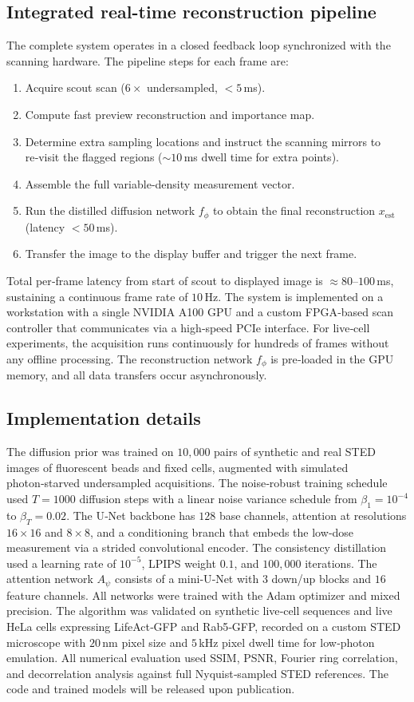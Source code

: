 \documentclass{article}
\begin{document}
\subsection{Integrated real-time reconstruction pipeline}
The complete system operates in a closed feedback loop synchronized with the scanning hardware. The pipeline steps for each frame are:
\begin{enumerate}
    \item Acquire scout scan ($6\times$ undersampled, $<5$\,ms).
    \item Compute fast preview reconstruction and importance map.
    \item Determine extra sampling locations and instruct the scanning mirrors to re‑visit the flagged regions ($\sim\!10$\,ms dwell time for extra points).
    \item Assemble the full variable‑density measurement vector.
    \item Run the distilled diffusion network $f_\phi$ to obtain the final reconstruction $x_{\mathrm{est}}$ (latency $< 50$\,ms).
    \item Transfer the image to the display buffer and trigger the next frame.
\end{enumerate}
Total per‑frame latency from start of scout to displayed image is $\approx 80$–$100$\,ms, sustaining a continuous frame rate of $10$\,Hz. The system is implemented on a workstation with a single NVIDIA A100 GPU and a custom FPGA‑based scan controller that communicates via a high‑speed PCIe interface. For live‑cell experiments, the acquisition runs continuously for hundreds of frames without any offline processing. The reconstruction network $f_\phi$ is pre‑loaded in the GPU memory, and all data transfers occur asynchronously.

\subsection{Implementation details}
The diffusion prior was trained on $10,000$ pairs of synthetic and real STED images of fluorescent beads and fixed cells, augmented with simulated photon‑starved undersampled acquisitions. The noise‑robust training schedule used $T = 1000$ diffusion steps with a linear noise variance schedule from $\beta_1 = 10^{-4}$ to $\beta_T = 0.02$. The U‑Net backbone has $128$ base channels, attention at resolutions $16\times 16$ and $8\times 8$, and a conditioning branch that embeds the low‑dose measurement via a strided convolutional encoder. The consistency distillation used a learning rate of $10^{-5}$, LPIPS weight $0.1$, and $100,000$ iterations. The attention network $A_\psi$ consists of a mini‑U‑Net with $3$ down/up blocks and $16$ feature channels. All networks were trained with the Adam optimizer and mixed precision. The algorithm was validated on synthetic live‑cell sequences and live HeLa cells expressing LifeAct‑GFP and Rab5‑GFP, recorded on a custom STED microscope with $20$\,nm pixel size and $5$\,kHz pixel dwell time for low‑photon emulation. All numerical evaluation used SSIM, PSNR, Fourier ring correlation, and decorrelation analysis against full Nyquist‑sampled STED references. The code and trained models will be released upon publication.
\end{document}
